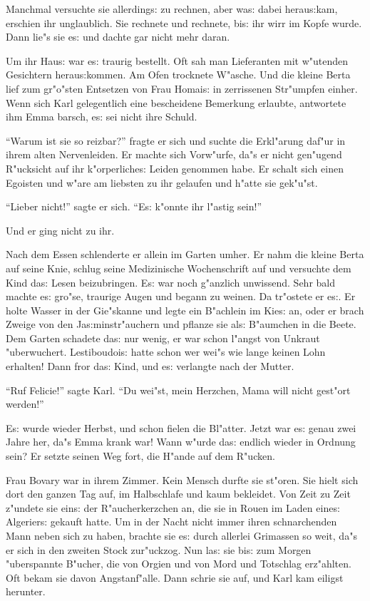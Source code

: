 \documentclass[oneside,12pt]{book}
\newcommand{\s}{s:}%
\begin{document}
Manchmal versuchte sie allerding{\s} zu rechnen, aber wa{\s} dabei
herau{\s}kam, erschien ihr unglaublich. Sie rechnete und rechnete,
bi{\s} ihr wirr im Kopfe wurde. Dann lie"s sie e{\s} und dachte
gar nicht mehr daran.

Um ihr Hau{\s} war e{\s} traurig bestellt. Oft sah man Lieferanten
mit w"utenden Gesichtern herau{\s}kommen. Am Ofen trocknete
W"asche. Und die kleine Berta lief zum gr"o"sten Entsetzen von
Frau Homai{\s} in zerrissenen Str"umpfen einher. Wenn sich Karl
gelegentlich eine bescheidene Bemerkung erlaubte, antwortete ihm
Emma barsch, e{\s} sei nicht ihre Schuld.

"`Warum ist sie so reizbar?"' fragte er sich und suchte die
Erkl"arung daf"ur in ihrem alten Nervenleiden. Er machte sich
Vorw"urfe, da"s er nicht gen"ugend R"ucksicht auf ihr
k"orperliche{\s} Leiden genommen habe. Er schalt sich einen
Egoisten und w"are am liebsten zu ihr gelaufen und h"atte sie
gek"u"st.

"`Lieber nicht!"' sagte er sich. "`E{\s} k"onnte ihr l"astig sein!"'

Und er ging nicht zu ihr.

Nach dem Essen schlenderte er allein im Garten umher. Er nahm die
kleine Berta auf seine Knie, schlug seine Medizinische Wochenschrift
auf und versuchte dem Kind da{\s} Lesen beizubringen. E{\s} war
noch g"anzlich unwissend. Sehr bald machte e{\s} gro"se, traurige
Augen und begann zu weinen. Da tr"ostete er e{\s}. Er holte Wasser
in der Gie"skanne und legte ein B"achlein im Kie{\s} an, oder er
brach Zweige von den Ja{\s}minstr"auchern und pflanze sie al{\s}
B"aumchen in die Beete. Dem Garten schadete da{\s} nur wenig, er
war schon l"angst von Unkraut "uberwuchert. Lestiboudoi{\s} hatte
schon wer wei"s wie lange keinen Lohn erhalten! Dann fror da{\s}
Kind, und e{\s} verlangte nach der Mutter.

"`Ruf Felicie!"' sagte Karl. "`Du wei"st, mein Herzchen, Mama will
nicht gest"ort werden!"'

E{\s} wurde wieder Herbst, und schon fielen die Bl"atter. Jetzt
war e{\s} genau zwei Jahre her, da"s Emma krank war! Wann w"urde
da{\s} endlich wieder in Ordnung sein? Er setzte seinen Weg fort,
die H"ande auf dem R"ucken.

Frau Bovary war in ihrem Zimmer. Kein Mensch durfte sie st"oren.
Sie hielt sich dort den ganzen Tag auf, im Halbschlafe und kaum
bekleidet. Von Zeit zu Zeit z"undete sie ein{\s} der
R"aucherkerzchen an, die sie in Rouen im Laden eine{\s}
Algerier{\s} gekauft hatte. Um in der Nacht nicht immer ihren
schnarchenden Mann neben sich zu haben, brachte sie e{\s} durch
allerlei Grimassen so weit, da"s er sich in den zweiten Stock
zur"uckzog. Nun la{\s} sie bi{\s} zum Morgen "uberspannte B"ucher,
die von Orgien und von Mord und Totschlag erz"ahlten. Oft bekam
sie davon Angstanf"alle. Dann schrie sie auf, und Karl kam eiligst
herunter.
\end{document}
